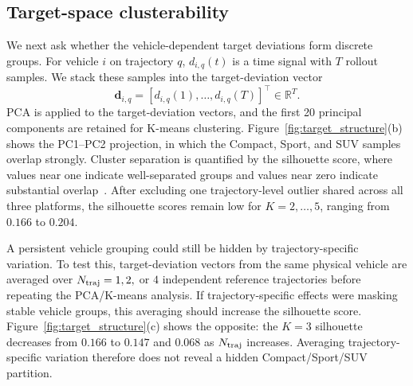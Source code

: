 \subsection{Target-space clusterability}
%
We next ask whether the vehicle-dependent target deviations form discrete groups.
For vehicle $i$ on trajectory $q$, $d_{i,q}(t)$ is a time signal with $T$ rollout samples.
We stack these samples into the target-deviation vector
%
\begin{equation}
    \boldsymbol d_{i,q}=[d_{i,q}(1),\ldots,d_{i,q}(T)]^\top\in\mathbb R^T.
\label{eq:target_signature}
\end{equation}
%
PCA is applied to the target-deviation vectors, and the first 20 principal components are retained for K-means clustering.
Figure~\ref{fig:target_structure}(b) shows the PC1--PC2 projection, in which the Compact, Sport, and SUV samples overlap strongly.
Cluster separation is quantified by the silhouette score, where values near one indicate well-separated groups and values near zero indicate substantial overlap~\cite{rousseeuw1987silhouettes}.
After excluding one trajectory-level outlier shared across all three platforms, the silhouette scores remain low for $K=2,\ldots,5$, ranging from $0.166$ to $0.204$.

A persistent vehicle grouping could still be hidden by trajectory-specific variation.
To test this, target-deviation vectors from the same physical vehicle are averaged over $N_{\rm traj}=1,2,$ or $4$ independent reference trajectories before repeating the PCA/K-means analysis.
If trajectory-specific effects were masking stable vehicle groups, this averaging should increase the silhouette score.
Figure~\ref{fig:target_structure}(c) shows the opposite: the $K=3$ silhouette decreases from $0.166$ to $0.147$ and $0.068$ as $N_{\rm traj}$ increases.
Averaging trajectory-specific variation therefore does not reveal a hidden Compact/Sport/SUV partition.

